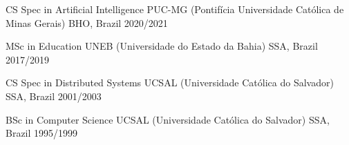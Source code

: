


\begin{cvhonors}



\cvhonor
{CS Spec in Artificial Intelligence} %
{PUC-MG (Pontifícia Universidade Católica de Minas Gerais)} %
{BHO, Brazil} %
{2020/2021} %
    

\cvhonor
{MSc in Education} %
{UNEB (Universidade do Estado da Bahia)} %
{SSA, Brazil} %
{2017/2019} %



\cvhonor
{CS Spec in Distributed Systems} %
{UCSAL (Universidade Católica do Salvador)} %
{SSA, Brazil} %
{2001/2003} %
    

\cvhonor
{BSc in Computer Science} %
{UCSAL (Universidade Católica do Salvador)} %
{SSA, Brazil} %
{1995/1999} %


\end{cvhonors}
